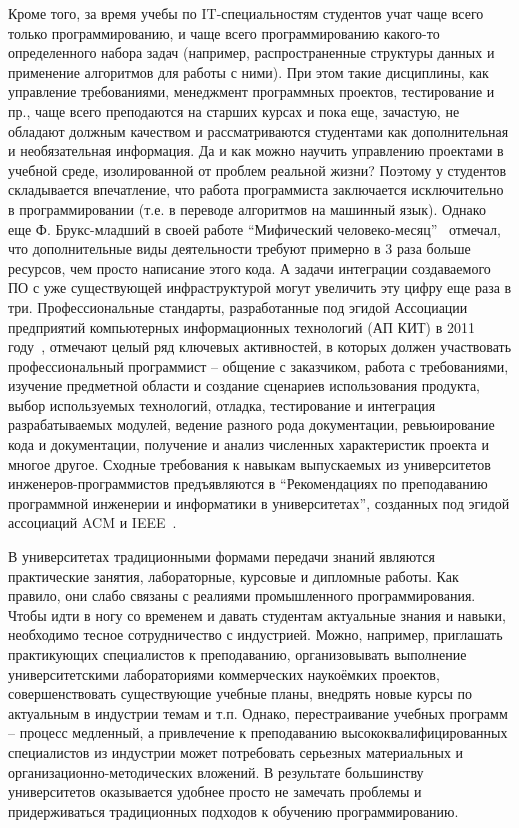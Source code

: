 \documentclass[a4paper]{article}
\begin{document}
Кроме того, за время учебы по IT-специальностям студентов учат чаще всего только программированию, и чаще всего программированию  какого-то определенного набора задач (например, распространенные структуры данных и применение алгоритмов для работы с ними). При этом такие дисциплины, как управление требованиями, менеджмент программных проектов, тестирование и пр., чаще всего преподаются на старших курсах и пока еще, зачастую, не обладают должным качеством и рассматриваются студентами как дополнительная и необязательная информация. Да и как можно научить управлению проектами в учебной среде, изолированной от проблем реальной жизни? Поэтому у студентов складывается впечатление, что работа программиста заключается исключительно в программировании  (т.е. в переводе алгоритмов на машинный язык). Однако еще Ф. Брукс-младший в своей работе ``Мифический человеко-месяц''~\cite{brooks} отмечал, что дополнительные виды деятельности требуют примерно в 3 раза больше ресурсов, чем просто написание этого кода. А задачи интеграции создаваемого ПО с уже существующей инфраструктурой могут увеличить эту цифру еще раза в три. Профессиональные стандарты, разработанные под эгидой Ассоциации предприятий компьютерных информационных технологий (АП КИТ) в 2011 году~\cite{apkit},  отмечают целый ряд ключевых активностей, в которых должен участвовать профессиональный программист -- общение с заказчиком, работа с требованиями, изучение предметной области и создание сценариев использования продукта, выбор используемых технологий, отладка, тестирование и интеграция разрабатываемых модулей, ведение разного рода документации, ревьюирование кода и документации, получение и анализ численных характеристик проекта и многое другое. Сходные требования к навыкам  выпускаемых из университетов инженеров-программистов предъявляются в ``Рекомендациях по преподаванию программной инженерии и информатики в университетах'', созданных под эгидой ассоциаций ACM и  IEEE~\cite{curriculum, terekhov2}. 

В университетах традиционными формами передачи знаний  являются практические занятия, лабораторные, курсовые и дипломные работы. Как правило, они слабо связаны с реалиями промышленного программирования. Чтобы идти в ногу со временем и давать студентам актуальные знания и навыки, необходимо тесное сотрудничество с индустрией. Можно, например, приглашать практикующих специалистов к преподаванию, организовывать выполнение университетскими лабораториями коммерческих наукоёмких  проектов, совершенствовать существующие учебные планы, внедрять новые курсы по актуальным в индустрии темам и  т.п. Однако, перестраивание учебных программ -- процесс медленный, а привлечение к преподаванию высококвалифицированных специалистов из индустрии может потребовать серьезных материальных и организационно-методических вложений. В результате большинству университетов оказывается удобнее просто не замечать проблемы и придерживаться традиционных подходов к обучению программированию.
\end{document}
